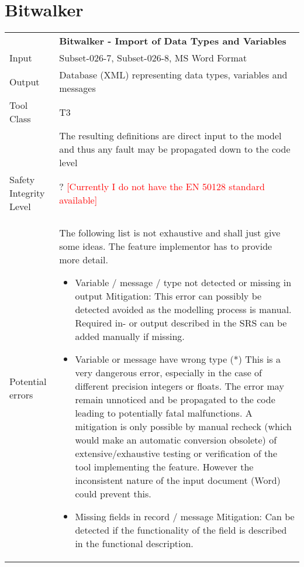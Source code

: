 \section{Bitwalker}
\label{sec:bitwalker-example}
\begin{longtable}{lp{}}
&\textbf{Bitwalker - Import of Data Types and Variables}\\
Input&Subset-026-7, Subset-026-8, MS Word Format\\
Output&Database (XML) representing data types, variables and messages\\
Tool Class&T3\\
          &The resulting definitions are direct input to the model and thus any fault may be propagated down to the code level\\
Safety Integrity Level&? \textcolor{red}{[Currently I do not have the EN 50128 standard available]}\\
Potential errors&The following list is not exhaustive and shall just give some ideas. The feature implementor has to provide more detail.
                                \begin{itemize}
                                  \item Variable / message / type not detected or missing in output\newline
                                       Mitigation: This error can possibly be detected avoided as the modelling process is manual. Required in- or output described in the
                                                   SRS can be added manually if missing.
                                  \item Variable or message have wrong type (*)\newline
                                       This is a very dangerous error, especially in the case of different precision integers or floats. The error may
                                       remain unnoticed and be propagated to the code leading to potentially fatal malfunctions. A mitigation is only possible by
                                       manual recheck (which would make an automatic conversion obsolete) of extensive/exhaustive testing or verification of the tool 
                                       implementing the feature. However the inconsistent nature of the input document (Word) could prevent this.
                                  \item Missing fields in record / message\newline
                                       Mitigation: Can be detected if the functionality of the field is described in the functional description.

\end{itemize}
\end{longtable}
